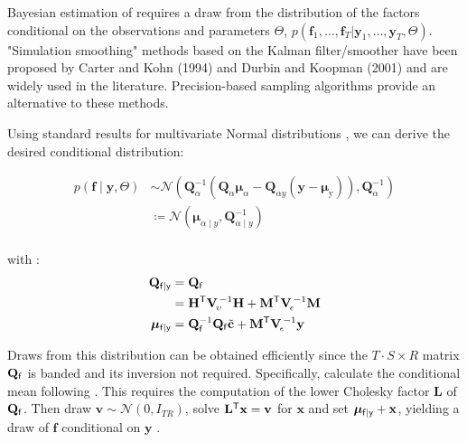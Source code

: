 \documentclass[notitlepage,a4paper,12pt]{article}
\newcommand{\transpose}[1]{{#1}^{\sf{T}}}
\begin{document}
Bayesian estimation of  requires a draw from the distribution of the factors conditional on the observations and parameters $\Theta$, $p(\mathbf{f}_1, \dots, \mathbf{f}_T | \mathbf{y}_1, \dots, \mathbf{y}_T, \Theta)$. "Simulation smoothing" methods based on the Kalman filter/smoother have been proposed by Carter and Kohn (1994) and Durbin and Koopman (2001) and are widely used in the literature. Precision-based sampling algorithms \citep{chanjeliazkov_2009} provide an alternative to these methods.

Using standard results for multivariate Normal distributions \citep[e.g.][pp. 86-87]{bishop_prml_2006}, we can derive the desired conditional distribution:

\begin{align*}
    p
    \left(
    \mathbf{f} \mid \mathbf{y}, \Theta
     \right) 
    &\sim
    \mathcal{N}
    \left(
    \mathbf{Q}^{-1}_{\alpha} \left( \mathbf{Q}_{\alpha}\boldsymbol{\mu}_{\alpha} - \mathbf{Q}_{\alpha y} \left(\mathbf{y} - \boldsymbol{\mu}_{\text{y}}\right)\right), \mathbf{Q}_{\alpha}^{-1}
    \right) \\
    &\coloneqq \mathcal{N}
        \left(
            \boldsymbol{\mu}_{\alpha\mid y}, \mathbf{Q}_{\alpha\mid y}^{-1}
        \right) \\
\end{align*}

with \citep[see also][eqn. 6-8]{chanjeliazkov_2009}:
\begin{align*}
    \mathbf{Q}_{\sf{f}\mid y} &= \mathbf{Q}_{\sf{f}} \\
    &= 
    \transpose{\mathbf{H}} \mathbf{V}^{\,-1}_{\!\upsilon} \mathbf{H} + {\transpose{\mathbf{M}} \mathbf{V}^{\,-1}_{\!\epsilon}\mathbf{M}}\\
    \boldsymbol\mu_{\sf{f}\mid y} &= \mathbf{Q}_{\sf{f}}^{-1} \mathbf{Q}_{\sf{f}} \tilde{\mathbf{c}}+ \transpose{\mathbf{M}} \mathbf{V}_{\!\epsilon}^{\,-1} \mathbf{y}
\end{align*}

Draws from this distribution can be obtained efficiently since the $T\cdot S \times R$ matrix $\mathbf{Q}_{\sf{f}}$ is banded and its inversion not required. Specifically, calculate the conditional mean following \citet[][Algorithm 2.1]{rueheld_2005}. This requires the computation of the lower Cholesky factor $\mathbf{L}$ of $\mathbf{Q}_{\sf{f}}$. Then draw $\mathbf{v} \sim \mathcal{N}(0,I_{TR})$, solve $\transpose{\mathbf{L}} \mathbf{x} = \mathbf{v}$ for $\mathbf{x}$ and set $\boldsymbol{\mu}_{\sf{f}\mid y} +\mathbf{x}$, yielding a draw of $\mathbf{f}$ conditional on $\mathbf{y}$ \citep[][Algorithm 2.4]{rueheld_2005}. 
\end{document}
